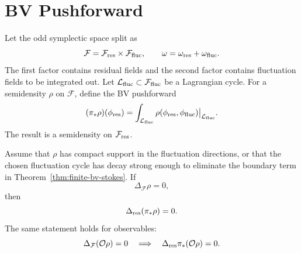 \section{BV Pushforward}

Let the odd symplectic space split as
\[
  \mathcal F=\mathcal F_{\rm res}\times\mathcal F_{\rm fluc},
  \qquad
  \omega=\omega_{\rm res}+\omega_{\rm fluc}.
\]
The first factor contains residual fields and the second factor contains
fluctuation fields to be integrated out.  Let
\(\mathcal L_{\rm fluc}\subset\mathcal F_{\rm fluc}\) be a Lagrangian cycle.
For a semidensity \(\rho\) on \(\mathcal F\), define the BV pushforward
\[
  (\pi_*\rho)(\phi_{\rm res})
  =
  \int_{\mathcal L_{\rm fluc}}
  \rho(\phi_{\rm res},\phi_{\rm fluc})\big|_{\mathcal L_{\rm fluc}} .
\]
The result is a semidensity on \(\mathcal F_{\rm res}\).

\begin{theorem}
\label{thm:bv-pushforward-qme-preservation}
Assume that \(\rho\) has compact support in the fluctuation directions, or
that the chosen fluctuation cycle has decay strong enough to eliminate the
boundary term in Theorem~\ref{thm:finite-bv-stokes}.  If
\[
  \Delta_{\mathcal F}\rho=0,
\]
then
\[
  \Delta_{\rm res}(\pi_*\rho)=0 .
\]
The same statement holds for observables:
\[
  \Delta_{\mathcal F}(\mathcal O\rho)=0
  \quad\Longrightarrow\quad
  \Delta_{\rm res}\pi_*(\mathcal O\rho)=0 .
\]
\end{theorem}

